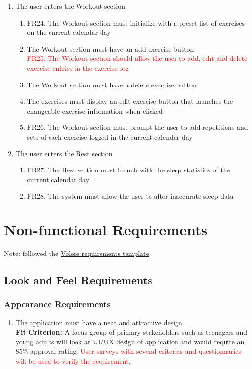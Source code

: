 \documentclass[12pt,letterpaper]{article}
\begin{document}
\begin{enumerate}[{BE}1.]
	\item The user enters the Workout section
	\begin{enumerate}[resume*]
		\item  FR24. The Workout section must initialize with a preset list of exercises on the current calendar day
\item {\color{red}\sout{The Workout section must have an add exercise button}}\\
\textcolor{red}{FR25. The Workout section should allow the user to add, edit and delete exercise entries in the exercise log}
\item {\color{red}\sout{The Workout section must have a delete exercise button}}
\item {\color{red}\sout{The exercises must display an edit exercise button that launches the changeable exercise information when clicked}}
		\item  FR26. The Workout section must prompt the user to add repetitions and sets of each exercise logged in the current calendar day
	\end{enumerate}
	
	\item The user enters the Rest section
	\begin{enumerate}[resume*]
		\item  FR27. The Rest section must launch with the sleep statistics of the current calendar day
		\item  FR28. The system must allow the user to alter inaccurate sleep data
	\end{enumerate}
\end{enumerate}

\section{Non-functional Requirements}
\noindent Note: followed the \href{https://www.volere.org/templates/volere-requirements-specification-template/}{Volere requirements template}

\subsection{Look and Feel Requirements}
\subsubsection{Appearance Requirements}
\begin{enumerate}[{LF}1.] 
	\item The application must have a neat and attractive design.\\
	{\textbf{Fit Criterion:} A focus group of primary stakeholders such as teenagers and young adults will look at UI/UX design of application and would require an 85\% approval rating. {\textcolor{red}{User surveys with several criterias and questionnaries will be used to verify the requirement.}}}
\end{enumerate}
\end{document}

